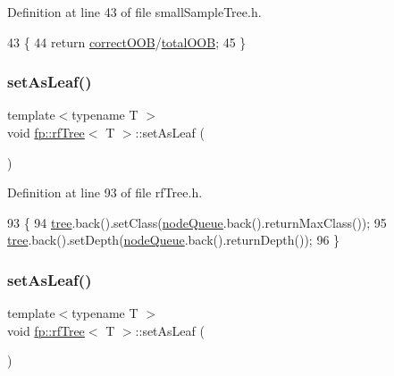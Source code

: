 Definition at line 43 of file small\+Sample\+Tree.\+h.


\begin{DoxyCode}
43                                         \{
44                     \textcolor{keywordflow}{return} \hyperlink{classfp_1_1rfTree_a83832650bcea8d63cdcd480d9ddc6e6e}{correctOOB}/\hyperlink{classfp_1_1rfTree_aa200dc228adc20c12e514364d2b674df}{totalOOB};
45                 \}
\end{DoxyCode}
\mbox{\label{classfp_1_1rfTree_a3583e1f1659ba9a9013a4891709bacb9}} 
\subsubsection{\texorpdfstring{set\+As\+Leaf()}{setAsLeaf()}\hspace{0.1cm}{\footnotesize\ttfamily [1/2]}}
{\footnotesize\ttfamily template$<$typename T $>$ \\
void \hyperlink{classfp_1_1rfTree}{fp\+::rf\+Tree}$<$ T $>$\+::set\+As\+Leaf (\begin{DoxyParamCaption}{ }\end{DoxyParamCaption})\hspace{0.3cm}{\ttfamily [inline]}}



Definition at line 93 of file rf\+Tree.\+h.


\begin{DoxyCode}
93                                        \{
94                     \hyperlink{classtree}{tree}.back().setClass(\hyperlink{classfp_1_1rfTree_af72d0a2f930fd480dfb4858885c2df23}{nodeQueue}.back().returnMaxClass());
95                     \hyperlink{classtree}{tree}.back().setDepth(\hyperlink{classfp_1_1rfTree_af72d0a2f930fd480dfb4858885c2df23}{nodeQueue}.back().returnDepth());
96                 \}
\end{DoxyCode}
\mbox{\label{classfp_1_1rfTree_a3583e1f1659ba9a9013a4891709bacb9}} 
\subsubsection{\texorpdfstring{set\+As\+Leaf()}{setAsLeaf()}\hspace{0.1cm}{\footnotesize\ttfamily [2/2]}}
{\footnotesize\ttfamily template$<$typename T $>$ \\
void \hyperlink{classfp_1_1rfTree}{fp\+::rf\+Tree}$<$ T $>$\+::set\+As\+Leaf (\begin{DoxyParamCaption}{ }\end{DoxyParamCaption})\hspace{0.3cm}{\ttfamily [inline]}}



